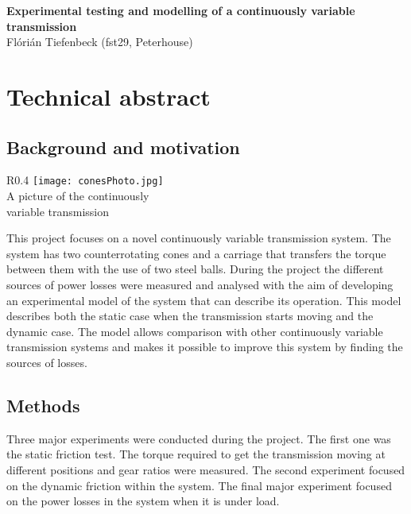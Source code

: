 \documentclass[12pt]{article}
\author{Flórián Tiefenbeck (fst29)}
\begin{document}
\begin{center}
{\LARGE \bf Experimental testing and modelling of a continuously variable transmission}\\
\vspace{4pt}
{\LARGE Flórián Tiefenbeck (fst29, Peterhouse)}\\
\end{center}

\section*{Technical abstract}
\subsection*{Background and motivation}
\begin{wrapfigure}{R}{0.4\textwidth}
    \vspace{-\intextsep}
    \centering
    \texttt{[image: conesPhoto.jpg]}
    \\A picture of the continuously
    \\variable transmission
\end{wrapfigure}


This project focuses on a novel continuously variable transmission system. The system has two counterrotating cones and a carriage that transfers the torque between them with the use of two steel balls. During the project the different sources of power losses were measured and analysed with the aim of developing an experimental model of the system that can describe its operation. This model describes both the static case when the transmission starts moving and the dynamic case. The model allows comparison with other continuously variable transmission systems and makes it possible to improve this system by finding the sources of losses.\\


\subsection*{Methods}
Three major experiments were conducted during the project. The first one was the static friction test. The torque required to get the transmission moving at different positions and gear ratios were measured. The second experiment focused on the dynamic friction within the system. The final major experiment focused on the power losses in the system when it is under load.\\
\end{document}

